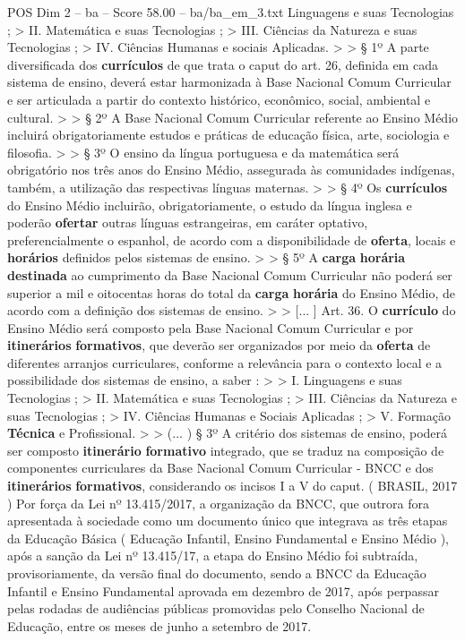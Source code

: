 \begin{textsample}{POS Dim 2 – ba – Score 58.00 – ba/ba\_em\_3.txt}
Linguagens e suas Tecnologias ; > II.
Matemática e suas Tecnologias ; > III.
Ciências da Natureza e suas Tecnologias ; > IV.
Ciências Humanas e sociais Aplicadas. > > § 1º A parte diversificada dos \textbf{currículos} de que trata o caput do art. 26, definida em cada sistema de ensino, deverá estar harmonizada à Base Nacional Comum Curricular e ser articulada a partir do contexto histórico, econômico, social, ambiental e cultural. > > § 2º A Base Nacional Comum Curricular referente ao Ensino Médio incluirá obrigatoriamente estudos e práticas de educação física, arte, sociologia e filosofia. > > § 3º O ensino da língua portuguesa e da matemática será obrigatório nos três anos do Ensino Médio, assegurada às comunidades indígenas, também, a utilização das respectivas línguas maternas. > > § 4º Os \textbf{currículos} do Ensino Médio incluirão, obrigatoriamente, o estudo da língua inglesa e poderão \textbf{ofertar} outras línguas estrangeiras, em caráter optativo, preferencialmente o espanhol, de acordo com a disponibilidade de \textbf{oferta}, locais e \textbf{horários} definidos pelos sistemas de ensino. > > § 5º A \textbf{carga} \textbf{horária} \textbf{destinada} ao cumprimento da Base Nacional Comum Curricular não poderá ser superior a mil e oitocentas horas do total da \textbf{carga} \textbf{horária} do Ensino Médio, de acordo com a definição dos sistemas de ensino. > > [... ] Art. 36.
O \textbf{currículo} do Ensino Médio será composto pela Base Nacional Comum Curricular e por \textbf{itinerários} \textbf{formativos}, que deverão ser organizados por meio da \textbf{oferta} de diferentes arranjos curriculares, conforme a relevância para o contexto local e a possibilidade dos sistemas de ensino, a saber : > > I.
Linguagens e suas Tecnologias ; > II.
Matemática e suas Tecnologias ; > III.
Ciências da Natureza e suas Tecnologias ; > IV.
Ciências Humanas e Sociais Aplicadas ; > V.
Formação \textbf{Técnica} e Profissional. > > (... ) § 3º A critério dos sistemas de ensino, poderá ser composto \textbf{itinerário} \textbf{formativo} integrado, que se traduz na composição de componentes curriculares da Base Nacional Comum Curricular - BNCC e dos \textbf{itinerários} \textbf{formativos}, considerando os incisos I a V do caput. ( BRASIL, 2017 ) Por força da Lei nº 13.415/2017, a organização da BNCC, que outrora fora apresentada à sociedade como um documento único que integrava as três etapas da Educação Básica ( Educação Infantil, Ensino Fundamental e Ensino Médio ), após a sanção da Lei nº 13.415/17, a etapa do Ensino Médio foi subtraída, provisoriamente, da versão final do documento, sendo a BNCC da Educação Infantil e Ensino Fundamental aprovada em dezembro de 2017, após perpassar pelas rodadas de audiências públicas promovidas pelo Conselho Nacional de Educação, entre os meses de junho a setembro de 2017.

\end{textsample}
